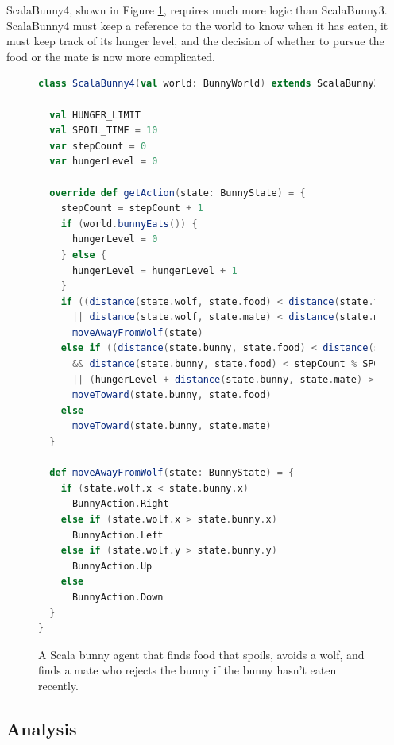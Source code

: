ScalaBunny4, shown in Figure \ref{fig:scala4}, requires much more logic than ScalaBunny3. ScalaBunny4 must keep a reference to the world to know when it has eaten, it must keep track of its hunger level, and the decision of whether to pursue the food or the mate is now more complicated.

\begin{figure}[h]
\begin{lstlisting}[language=Scala]
class ScalaBunny4(val world: BunnyWorld) extends ScalaBunny3 {

  val HUNGER_LIMIT
  val SPOIL_TIME = 10
  var stepCount = 0
  var hungerLevel = 0

  override def getAction(state: BunnyState) = {
    stepCount = stepCount + 1
    if (world.bunnyEats()) {
      hungerLevel = 0
    } else {
      hungerLevel = hungerLevel + 1
    }
    if ((distance(state.wolf, state.food) < distance(state.food, state.bunny))
      || distance(state.wolf, state.mate) < distance(state.mate, state.bunny))
      moveAwayFromWolf(state)
    else if ((distance(state.bunny, state.food) < distance(state.bunny, state.mate)
      && distance(state.bunny, state.food) < stepCount % SPOIL_TIME)
      || (hungerLevel + distance(state.bunny, state.mate) > HUNGER_LIMIT)
      moveToward(state.bunny, state.food)
    else
      moveToward(state.bunny, state.mate)
  }

  def moveAwayFromWolf(state: BunnyState) = {
    if (state.wolf.x < state.bunny.x)
      BunnyAction.Right
    else if (state.wolf.x > state.bunny.x)
      BunnyAction.Left
    else if (state.wolf.y > state.bunny.y)
      BunnyAction.Up
    else
      BunnyAction.Down
  }
}
\end{lstlisting}
\caption{A Scala bunny agent that finds food that spoils, avoids a wolf, and finds a mate who rejects the bunny if the bunny hasn't eaten recently.}
\label{fig:scala4}
\end{figure}

\subsection{Analysis}

